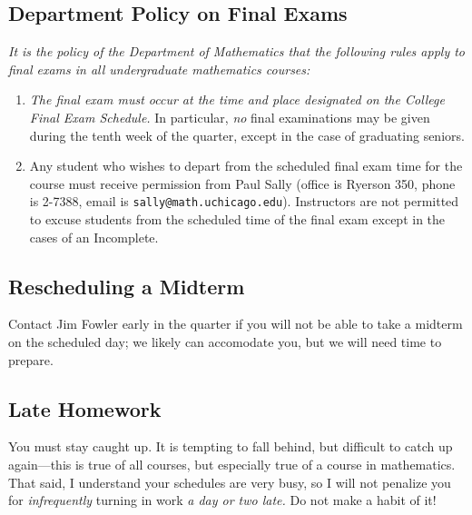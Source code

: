 \documentclass[12pt,letterpaper]{article}
\begin{document}
\subsection*{Department Policy on Final Exams}

\textit{It is the policy of the Department of Mathematics that the
following rules apply to final exams in all undergraduate mathematics
courses:}
\begin{enumerate}
\item \textit{The final exam must occur at the time and place designated on
the College Final Exam Schedule.}  In particular, \textit{no} final examinations
may be given during the tenth week of the quarter, except in the case
of graduating seniors.
\item Any student who wishes to depart from the scheduled final exam
time for the course must receive permission from Paul Sally (office is
Ryerson 350, phone is 2-7388, email is
\texttt{sally@math.uchicago.edu}).  Instructors are not permitted to
excuse students from the scheduled time of the final exam except in
the cases of an Incomplete.
\end{enumerate}

\subsection*{Rescheduling a Midterm}

Contact Jim Fowler early in the quarter if you will not be able to
take a midterm on the scheduled day; we likely can accomodate you, but
we will need time to prepare.

\subsection*{Late Homework}

You must stay caught up.  It is tempting to fall behind, but difficult
to catch up again---this is true of all courses, but especially true
of a course in mathematics.  That said, I understand your schedules
are very busy, so I will not penalize you for \textit{infrequently}
turning in work \textit{a day or two late.}  Do not make a habit of
it!
\end{document}
